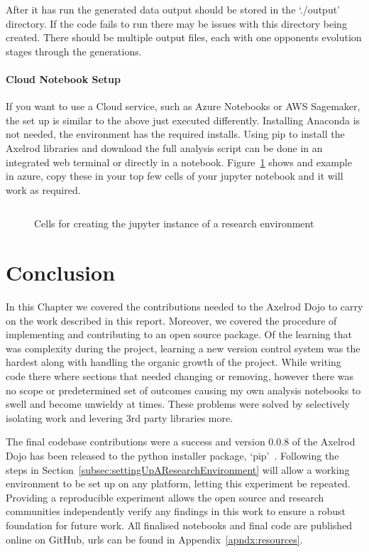 After it has run the generated data output should be stored in the `./output' directory.
If the code fails to run there may be issues with this directory being created.
There should be multiple output files, each with one opponents evolution stages through the generations.

\paragraph{Cloud Notebook Setup} 
If you want to use a Cloud service, such as Azure Notebooks or AWS Sagemaker, the set up is similar to the above just executed differently.
Installing Anaconda is not needed, the environment has the required installs.
Using pip to install the Axelrod libraries and download the full analysis script can be done in an integrated web terminal or directly in a notebook.
Figure~\ref{code:jupyterExample} shows and example in azure, copy these in your top few cells of your jupyter notebook and it will work as required.

\begin{figure}[ht]
    \inputminted{python}{code_snippets/dev-examples/jupyterCells.py}
    \caption{Cells for creating the jupyter instance of a research environment}\label{code:jupyterExample}
\end{figure}

\section{Conclusion}
In this Chapter we covered the contributions needed to the Axelrod Dojo to carry on the work described in this report. Moreover, we covered the procedure of implementing and contributing to an open source package.
Of the learning that was complexity during the project, learning a new version control system was the hardest along with handling the organic growth of the project.
While writing code there where sections that needed changing or removing, however there was no scope or predetermined set of outcomes causing my own analysis notebooks to swell and become unwieldy at times.
These problems were solved by selectively isolating work and levering 3rd party libraries more.

The final codebase contributions were a success and version 0.0.8 of the Axelrod Dojo has been released to the python installer package, `pip'~\cite{dojoV008}.
Following the steps in Section~\ref{subsec:settingUpAResearchEnvironment} will allow a working environment to be set up on any platform, letting this experiment be repeated.
Providing a reproducible experiment allows the open source and research communities independently verify any findings in this work to ensure a robust foundation for future work.
All finalised notebooks and final code are published online on GitHub, urls can be found in Appendix~\ref{apndx:resources}.